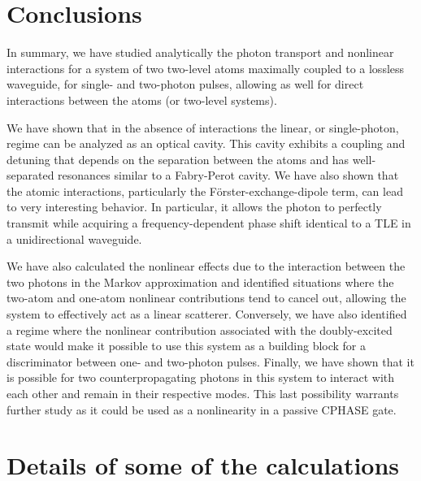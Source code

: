 \documentclass[aps,pra,twocolumn,floatfix,superscriptaddress]{revtex4}
\begin{document}
\section{Conclusions}

In summary, we have studied analytically the photon transport and nonlinear interactions for a system of two two-level atoms maximally coupled to a lossless waveguide, for single- and two-photon pulses, allowing as well for direct interactions between the atoms (or two-level systems).  

We have shown that in the absence of interactions the linear, or single-photon, regime can be analyzed as an optical cavity.  This cavity exhibits a coupling and detuning that depends on the separation between the atoms and has well-separated resonances similar to a Fabry-Perot cavity. We have also shown that the atomic interactions, particularly the F\"orster-exchange-dipole term, can lead to very interesting behavior.  In particular, it allows the photon to perfectly transmit while acquiring  a frequency-dependent phase shift identical to a TLE in a unidirectional waveguide. 

We have also calculated the nonlinear effects due to the interaction between the two photons in the Markov approximation and identified situations where the two-atom and one-atom nonlinear contributions tend to cancel out,  allowing the system to effectively act as a linear scatterer.  Conversely, we have also identified a regime where the nonlinear contribution associated with the doubly-excited state would make it possible to use this system as a building block for a discriminator between one- and two-photon pulses. Finally, we have shown that it is possible for two counterpropagating photons in this system to interact with each other and remain in their respective modes. This last possibility warrants further study as it could be used as a nonlinearity in a passive CPHASE gate. 

\appendix*

\section{Details of some of the calculations}
\end{document}
